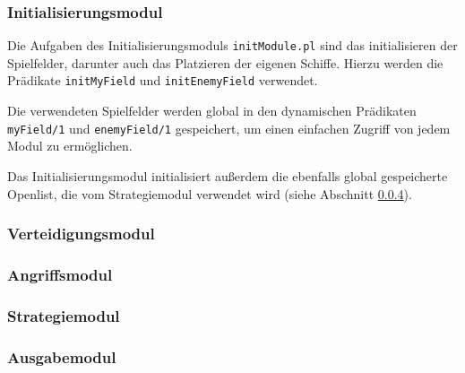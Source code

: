\subsubsection{Initialisierungsmodul} \label{sec:initModule}
	Die Aufgaben des Initialisierungsmoduls \texttt{initModule.pl} sind das initialisieren der Spielfelder, darunter auch
	das Platzieren der eigenen Schiffe. Hierzu werden die Prädikate \texttt{initMyField} und \texttt{initEnemyField} verwendet.
	
	Die verwendeten Spielfelder werden global in den dynamischen Prädikaten \texttt{myField/1} und \texttt{enemyField/1}
	gespeichert, um einen einfachen Zugriff von jedem Modul zu ermöglichen. 
	
	Das Initialisierungsmodul initialisiert außerdem die ebenfalls global gespeicherte Openlist, 
	die vom Strategiemodul verwendet wird (siehe Abschnitt \ref{sec:strategy}). 

\subsubsection{Verteidigungsmodul} \label{sec:defendModule}
\subsubsection{Angriffsmodul} \label{sec:attackModule}
\subsubsection{Strategiemodul} \label{sec:strategy}
\subsubsection{Ausgabemodul}

